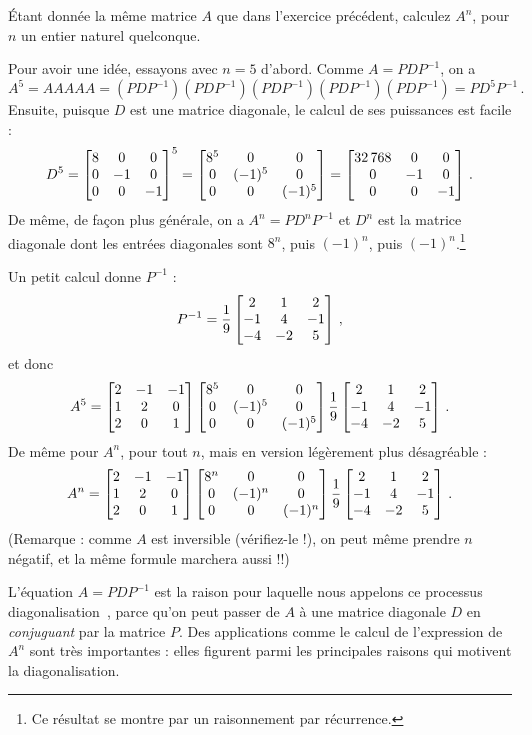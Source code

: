 \begin{myprob}
Étant donnée la même matrice $A$ que dans l'exercice pr\'ec\'edent, calculez $A^n$, pour $n$ un entier naturel quelconque. 

\begin{mysol}
Pour avoir une id\'ee, essayons avec $n=5$ d'abord.
Comme $A = PDP^{-1}$, on a 
$$
A^5 = AAAAA = (PDP^{-1})(PDP^{-1})(PDP^{-1})(PDP^{-1})(PDP^{-1}) = PD^5P^{-1}\,.
$$
Ensuite, puisque $D$ est une matrice diagonale, le calcul de ses puissances est facile :
$$
D^5 = \left[ \begin{matrix} 8 & 0 & 0\\  0 & -1 & 0\\ 0 & 0 & -1 \end{matrix} \right]^5 = 
\left[ \begin{matrix} 8^5 & 0 & 0\\ 0 & (-1)^5 & 0 \\ 0 & 0 & (-1)^5 \end{matrix} \right]
= \left[ \begin{matrix} 32\, 768 & 0 & 0\\  0 & -1 & 0\\ 0 & 0 & -1 \end{matrix} \right]\,.
$$
De même, de façon plus générale, on a $A^n = PD^n P^{-1}$ et $D^n$ est la matrice diagonale
dont les entrées diagonales sont $8^n$, puis $(-1)^n$, puis $(-1)^n$.\footnote{Ce résultat se montre par un raisonnement par récurrence.}

Un petit calcul donne $P^{-1}$ :
$$
P^{-1} = \frac19 \left[ \begin{matrix} 2&1&2\\-1&4&-1\\-4&-2&5 \end{matrix} \right]\,,
$$
et donc 
$$
A^5 = \left[ \begin{matrix} 2 & -1 & -1 \\ 1 & 2 & 0\\ 2 & 0 & 1 \end{matrix} \right]\left[ \begin{matrix} 8^5 & 0 & 0\\ 0 & (-1)^5 & 0 \\ 0 & 0 & (-1)^5 \end{matrix} \right]\frac19 \left[ \begin{matrix} 2&1&2\\-1&4&-1\\-4&-2&5 \end{matrix} \right]\,.
$$
De même pour $A^n$, pour tout $n$, mais en version légèrement plus désagréable :
$$
A^n = \left[ \begin{matrix} 2 & -1 & -1 \\ 1 & 2 & 0\\ 2 & 0 & 1 \end{matrix} \right]\left[ \begin{matrix} 8^n & 0 & 0\\ 0 & (-1)^n & 0 \\ 0 & 0 & (-1)^n \end{matrix} \right]\frac19 \left[ \begin{matrix} 2&1&2\\-1&4&-1\\-4&-2&5 \end{matrix} \right]\,.
$$
(Remarque : comme $A$ est inversible (v\'erifiez-le !), on peut m\^eme prendre $n$ négatif, et la même formule marchera aussi !\!!)
\end{mysol} \end{myprob}


L'équation $A = PDP^{-1}$ est la raison pour laquelle nous appelons ce processus \og diagonalisation\ \fg, parce qu'on peut passer de $A$ à une matrice diagonale $D$ en \emph{conjuguant} par la matrice $P$.
Des applications comme le calcul de l'expression de $A^n$ sont très importantes : elles figurent parmi les principales raisons qui motivent la diagonalisation.

